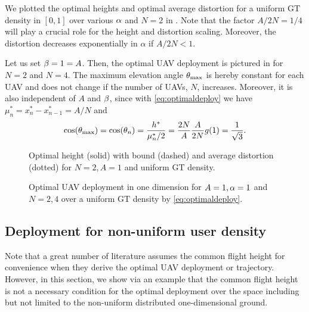 \documentclass[12pt,onecolumn,journal,draftclsnofoot,letterpaper]{IEEEtran}
\newcounter{example}[section]
\newenvironment{example}[1][]{\refstepcounter{example}\par\vspace{1.5ex}\noindent{\em Example~\theexample. #1}}{\par\vspace{1.5ex}}
\newcommand{\junstart}{\color{black}}
\begin{document}
\begin{example}
We plotted  the optimal heights and optimal average distortion for a uniform GT density in $[0,1]$ over various $\alpha$
and $N=2$ in . Note that the factor $A/2N=1/4$ will play a crucial role for the height and
distortion scaling. Moreover, the distortion decreases exponentially in $\alpha$ if $A/2N<1$.

Let us set $\beta=1=A$. Then, the optimal UAV deployment is pictured in  for $N=2$ and $N=4$. The
maximum elevation angle $\theta_{\text{max}}$ is hereby constant for each UAV and does not change if the number of UAVs,
$N$, increases.  Moreover, it is also independent of $A$ and $\beta$, since with \eqref{eq:optimaldeploy} we have
$\mu_n^*=x^*_n-x^*_{n-1}=A/N$ and
%
\begin{align}
  \cos(\theta_{\text{max}})=\cos(\theta_n)= \frac{h^*}{\mu^*_n/2}= \frac{2N}{A}\frac{A}{2N}   g(1)= \frac{1}{\sqrt{3}}.
\end{align}
\end{example}
% 
\begin{figure}
\begin{minipage}[b]{0.4\textwidth}
  \vspace{1ex}
\def\svgwidth{1.1\textwidth} \scriptsize{
  }
  \vspace{-3.2ex}
  \caption{{\small Optimal height (solid) with bound (dashed) and average distortion (dotted) for 
  $N=2,A=1$ and uniform GT density.}}
  \label{fig:goptdopt}
\end{minipage}
\hfill
  \begin{minipage}[b]{0.56\textwidth}
\hspace{-2ex} 
    \def\svgwidth{1.1\textwidth} \scriptsize{
      }
      \caption{{\small Optimal UAV deployment in one dimension for $A=1,\alpha=1$ and $N=2,4$ over a uniform GT density
      by \eqref{eq:optimaldeploy}.}}
      \label{fig:uavonedim}
    \end{minipage}
\end{figure}
%


\junstart
{} %
\subsection{Deployment for non-uniform user density}
%
Note that a great number of literature assumes the common flight height for convenience when they derive the optimal UAV
deployment or trajectory.  However, in this section, we show via an example that the common flight height is not a
necessary condition for the optimal deployment over the space including but not limited to the non-uniform distributed
one-dimensional ground.
\fi %
\end{document}
